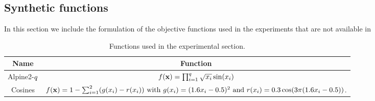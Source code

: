 \documentclass[twoside]{article}
\begin{document}
\subsection{Synthetic functions}

In this section we include the formulation of the objective functions used in the experiments that are not available in


\begin{table}[h!]
\centering
\begin{tabular}{cc}
\toprule
Name & Function     \\ \hline\hline
Alpine2-$q$ & $f(\mathbf{x}) =\prod_{i=1}^{q} \sqrt{x_i}\sin(x_i)$  \\
Cosines &  $f(\mathbf{x}) = 1- \sum_{i=1}^2 (g(x_i) - r(x_i) )  \mbox{ with } g(x_i) = (1.6x_i - 0.5)^2 \mbox{ and } r(x_i) = 0.3 \cos (3\pi (1.6 x_i -0.5))$. \\
\bottomrule
\end{tabular}\caption{Functions used in the experimental section.}\label{table:functions_test}
\end{table}

\end{document}
